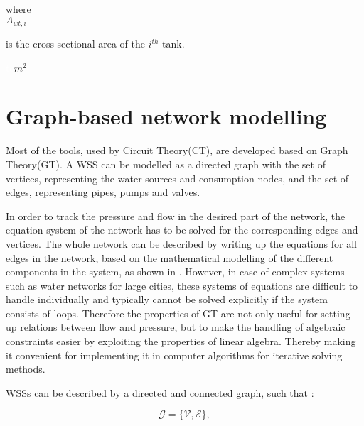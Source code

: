  \begin{minipage}[t]{0.20\textwidth}
where\\
\hspace*{8mm} $A_{wt,i}$ 
\end{minipage}
\begin{minipage}[t]{0.68\textwidth}
\vspace*{2mm}
is the cross sectional area of the $i^{th}$ tank.
\end{minipage}
\begin{minipage}[t]{0.10\textwidth}
\vspace*{2mm}
\textcolor{White}{te}$\unit{m^2}$
\end{minipage} 



\section{Graph-based network modelling}
\label{graph_based_network_modelling}

Most of the tools, used by Circuit Theory(CT), are developed based on Graph Theory(GT). A WSS can be modelled as a directed graph with the set of vertices, representing the water sources and consumption nodes, and the set of edges, representing pipes, pumps and valves. 

In order to track the pressure and flow in the desired part of the network, the equation system of the network has to be solved for the corresponding edges and vertices. The whole network can be described by writing up the equations for all edges in the network, based on the mathematical modelling of the different components in the system, as shown in . However, in case of complex systems such as water networks for large cities, these systems of equations are difficult to handle individually and typically cannot be solved explicitly if the system consists of loops. Therefore the properties of GT are not only useful for setting up relations between flow and pressure, but to make the handling of algebraic constraints easier by exploiting the properties of linear algebra. Thereby making it convenient for implementing it in computer algorithms for iterative solving methods.  

WSSs can be described by a directed and connected graph, such that \cite{graph_intro}: 

\begin{equation}
  \label{Numberofchords}
  \mathcal{G} = \{\mathcal{V}, \mathcal{E} \} ,
\end{equation}

